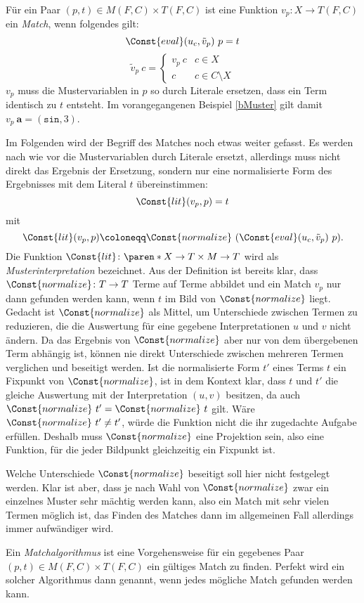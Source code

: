 \begin{definition} \label{defMatch}
Für ein Paar $(p, t) \in M(F, C) \times T(F, C)$ ist eine Funktion $v_p \colon X \rightarrow T(F, C)$ ein \emph{Match}, wenn folgendes gilt:
$$\Const{eval}(u_c, \tilde v_p)~ p = t$$
$$\tilde v_p~ c = \begin{cases}
	v_p~ c & c \in X\\
	c      & c \in C \setminus X
\end{cases}$$
$v_p$ muss die Mustervariablen in $p$ so durch Literale ersetzen, dass ein Term identisch zu $t$ entsteht. 
Im vorangegangenen Beispiel \ref{bMuster} gilt damit $v_p~ \mathbf a = (\texttt{sin}, 3)$.

Im Folgenden wird der Begriff des Matches noch etwas weiter gefasst. Es werden nach wie vor die Mustervariablen durch Literale ersetzt, allerdings muss nicht direkt das Ergebnis der Ersetzung, sondern nur eine normalisierte Form des Ergebnisses mit dem Literal $t$ übereinstimmen:
$$\Const{lit}(v_p, p)  = t$$
mit 
$$\Const{lit}(v_p, p) \coloneqq \Const{normalize}~(\Const{eval}(u_c, \tilde v_p)~ p).$$
Die Funktion $\Const{lit} \colon \paren*{X \rightarrow T} \times M \rightarrow T$ wird als \emph{Musterinterpretation} bezeichnet.
Aus der Definition ist bereits klar, dass $\Const{normalize} \colon T \rightarrow T$ Terme auf Terme abbildet und ein Match $v_p$ nur dann gefunden werden kann, wenn $t$ im Bild von $\Const{normalize}$ liegt. 
Gedacht ist $\Const{normalize}$ als Mittel, um Unterschiede zwischen Termen zu reduzieren, die die Auswertung für eine gegebene Interpretationen $u$ und $v$ nicht ändern. Da das Ergebnis von $\Const{normalize}$ aber nur von dem übergebenen Term abhängig ist, können nie direkt Unterschiede zwischen mehreren Termen verglichen und beseitigt werden. Ist die normalisierte Form $t'$ eines Terms $t$ ein Fixpunkt von $\Const{normalize}$, ist in dem Kontext klar, dass $t$ und $t'$ die gleiche Auswertung mit der Interpretation $(u, v)$ besitzen, da auch $\Const{normalize}~t' = \Const{normalize}~t$ gilt. Wäre $\Const{normalize}~t' \neq t'$, würde die Funktion nicht die ihr zugedachte Aufgabe erfüllen. Deshalb muss $\Const{normalize}$ eine Projektion sein, also eine Funktion, für die jeder Bildpunkt gleichzeitig ein Fixpunkt ist. 

Welche Unterschiede $\Const{normalize}$ beseitigt soll hier nicht festgelegt werden. Klar ist aber, dass je nach Wahl von $\Const{normalize}$ zwar ein einzelnes Muster sehr mächtig werden kann, also ein Match mit sehr vielen Termen möglich ist, das Finden des Matches dann im allgemeinen Fall allerdings immer aufwändiger wird. 

\end{definition}

Ein \emph{Matchalgorithmus} ist eine Vorgehensweise für ein gegebenes Paar $(p, t) \in M(F, C) \times T(F, C)$ ein gültiges Match zu finden. Perfekt wird ein solcher Algorithmus dann genannt, wenn jedes mögliche Match gefunden werden kann.


